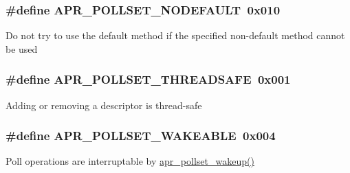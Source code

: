 \subsubsection[{\texorpdfstring{A\+P\+R\+\_\+\+P\+O\+L\+L\+S\+E\+T\+\_\+\+N\+O\+D\+E\+F\+A\+U\+LT}{APR_POLLSET_NODEFAULT}}]{\setlength{\rightskip}{0pt plus 5cm}\#define A\+P\+R\+\_\+\+P\+O\+L\+L\+S\+E\+T\+\_\+\+N\+O\+D\+E\+F\+A\+U\+LT~0x010}\hypertarget{group__pollflags_gaa46a9cbb23b2e8e71dd3ba88e69fdf13}{}\label{group__pollflags_gaa46a9cbb23b2e8e71dd3ba88e69fdf13}
Do not try to use the default method if the specified non-\/default method cannot be used 
\subsubsection[{\texorpdfstring{A\+P\+R\+\_\+\+P\+O\+L\+L\+S\+E\+T\+\_\+\+T\+H\+R\+E\+A\+D\+S\+A\+FE}{APR_POLLSET_THREADSAFE}}]{\setlength{\rightskip}{0pt plus 5cm}\#define A\+P\+R\+\_\+\+P\+O\+L\+L\+S\+E\+T\+\_\+\+T\+H\+R\+E\+A\+D\+S\+A\+FE~0x001}\hypertarget{group__pollflags_gabdfaccfd394c847f692351dee2e5ef7f}{}\label{group__pollflags_gabdfaccfd394c847f692351dee2e5ef7f}
Adding or removing a descriptor is thread-\/safe 
\subsubsection[{\texorpdfstring{A\+P\+R\+\_\+\+P\+O\+L\+L\+S\+E\+T\+\_\+\+W\+A\+K\+E\+A\+B\+LE}{APR_POLLSET_WAKEABLE}}]{\setlength{\rightskip}{0pt plus 5cm}\#define A\+P\+R\+\_\+\+P\+O\+L\+L\+S\+E\+T\+\_\+\+W\+A\+K\+E\+A\+B\+LE~0x004}\hypertarget{group__pollflags_ga552d7f28d442602e6c9bb6931f183493}{}\label{group__pollflags_ga552d7f28d442602e6c9bb6931f183493}
Poll operations are interruptable by \hyperlink{group__apr__poll_gac5e86828143e169e18b2a6eab94be531}{apr\+\_\+pollset\+\_\+wakeup()} 